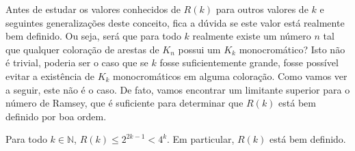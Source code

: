 Antes de estudar os valores conhecidos de $R(k)$ para outros valores de $k$ e seguintes generalizações deste conceito, fica a dúvida se este valor está realmente bem definido. Ou seja, será que para todo $k$ realmente existe um número $n$ tal que qualquer coloração de arestas de $K_n$ possui um $K_k$ monocromático? Isto não é trivial, poderia ser o caso que se $k$ fosse suficientemente grande, fosse possível evitar a existência de $K_k$ monocromáticos em alguma coloração. Como vamos ver a seguir, este não é o caso. De fato, vamos encontrar um limitante superior para o número de Ramsey, que é suficiente para determinar que $R(k)$ está bem definido por boa ordem.

\begin{theorem}[Ramsey 1930]
\label{thm:ramsey}
Para todo $k \in \mathbb{N}$, $R(k) \leq 2^{2k-1} < 4^k $. Em particular, $R(k)$ está bem definido.
\end{theorem}
